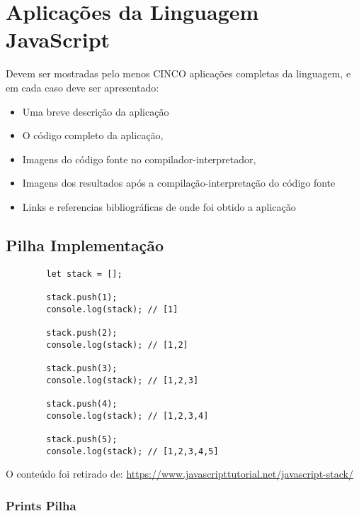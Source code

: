 


\chapter{ Aplica\c{c}\~{o}es da Linguagem JavaScript}

Devem ser mostradas pelo menos CINCO aplica\c{c}\~{o}es completas da linguagem, e em cada caso deve ser apresentado:
\begin{itemize}
  \item Uma breve descri\c{c}\~{a}o da aplica\c{c}\~{a}o
  \item O c\'{o}digo completo da aplica\c{c}\~{a}o,
  \item Imagens do c\'{o}digo fonte no compilador-interpretador,
  \item Imagens dos resultados ap\'{o}s a compila\c{c}\~{a}o-interpreta\c{c}\~{a}o do c\'{o}digo fonte
  \item Links e referencias bibliogr\'{a}ficas de onde foi obtido a aplica\c{c}\~{a}o
\end{itemize}




    \section{Pilha Implementação}
    \begin{lstlisting}
    	let stack = [];
    	
    	stack.push(1);
    	console.log(stack); // [1]
    	
    	stack.push(2);
    	console.log(stack); // [1,2]
    	
    	stack.push(3);
    	console.log(stack); // [1,2,3]
    	
    	stack.push(4);
    	console.log(stack); // [1,2,3,4]
    	
    	stack.push(5);
    	console.log(stack); // [1,2,3,4,5]
    \end{lstlisting}
    O conteúdo foi retirado de: \url{https://www.javascripttutorial.net/javascript-stack/}

	\subsection{Prints Pilha}
	
